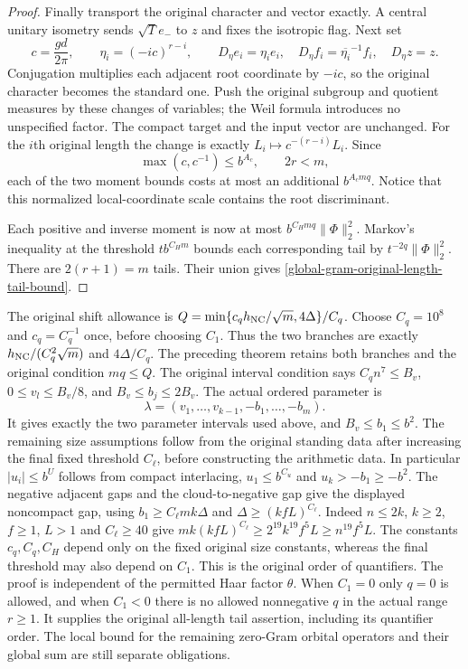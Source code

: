 \begin{proof}
Finally transport the original character and vector exactly.
A central unitary isometry sends $\sqrt T e_-$ to $z$ and
fixes the isotropic flag.  Next set
\[
 c=\frac{g d}{2\pi},\qquad
 \eta_i=(-ic)^{r-i},\qquad
 D_\eta e_i=\eta_i e_i,
 \quad D_\eta f_i=\overline{\eta_i}^{-1}f_i,
 \quad D_\eta z=z.
\]
Conjugation multiplies each adjacent root coordinate by $-ic$,
so the original character becomes the standard one.
Push the original subgroup and quotient measures by these
changes of variables; the Weil formula introduces no unspecified
factor.  The compact target and the input vector are unchanged.
For the $i$th original length the change is exactly
$L_i\mapsto c^{-(r-i)}L_i$.
Since
\[
 \max(c,c^{-1})\le b^{A_c},\qquad 2r<m,
\]
each of the two moment bounds costs at most an additional
$b^{A_cmq}$.  Notice that this normalized local-coordinate
scale contains the root discriminant.

Each positive and inverse moment is now at most
$b^{C_Hmq}\|\Phi\|_2^2$.
Markov's inequality at the threshold $t b^{C_Hm}$ bounds
each corresponding tail by $t^{-2q}\|\Phi\|_2^2$.
There are $2(r+1)=m$ tails.  Their union gives
\eqref{global-gram-original-length-tail-bound}.
\end{proof}

The original shift allowance is
$Q=\min\{c_q h_{\rm NC}/\sqrt m,4\Delta\}/C_q$.
Choose $C_q=10^8$ and $c_q=C_q^{-1}$ once, before choosing
$C_1$.  Thus the two branches are exactly
$h_{\rm NC}/(C_q^2\sqrt m)$ and $4\Delta/C_q$.
The preceding theorem retains both branches and the original
condition $mq\le Q$.  The original interval condition says
$C_qn^7\le B_v$, $0\le v_l\le B_v/8$, and
$B_v\le b_j\le2B_v$.  The actual ordered parameter is
\[
             \lambda=(v_1,\ldots,v_{k-1},-b_1,\ldots,-b_m).
\]
It gives exactly the two parameter intervals used above, and
$B_v\le b_1\le b^2$.  The remaining size assumptions follow
from the original standing data after increasing the final fixed
threshold $C_\ell$, before constructing the arithmetic data.
In particular $|u_i|\le b^U$ follows from compact interlacing,
$u_1\le b^{C_u}$ and $u_k>-b_1\ge-b^2$.
The negative adjacent gaps and the cloud-to-negative gap give
the displayed noncompact gap, using
$b_1\ge C_\ell mk\Delta$ and $\Delta\ge(kfL)^{C_\ell}$.
Indeed $n\le2k$, $k\ge2$, $f\ge1$, $L>1$ and
$C_\ell\ge40$ give
$mk(kfL)^{C_\ell}\ge2^{19}k^{19}f^5L\ge n^{19}f^5L$.
The constants $c_q,C_q,C_H$ depend only on the fixed original
size constants, whereas the final threshold may also depend on
$C_1$.  This is the original order of quantifiers.
The proof is independent of the permitted Haar factor $\theta$.
When $C_1=0$ only $q=0$ is allowed, and when $C_1<0$ there is
no allowed nonnegative $q$ in the actual range $r\ge1$.
It supplies the original all-length tail assertion, including its
quantifier order.  The local bound for the remaining zero-Gram
orbital operators and their global sum are still separate obligations.
